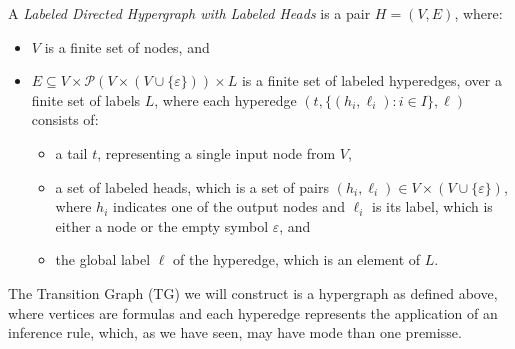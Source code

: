 \begin{definition}
A \emph{Labeled Directed Hypergraph with Labeled Heads} is a pair $H = (V, E)$, where:
\begin{itemize}
  \item \( V \) is a finite set of nodes, and
  \item \( E \subseteq V \times \mathcal{P}(V \times (V \cup \{\varepsilon\})) \times L \) is a finite set of labeled hyperedges, over a finite set of labels $L$, where each hyperedge $(t,\{(h_i,\ell_i): i\in I\}, \ell)$ consists of:
  \begin{itemize}
    \item a tail $t$, representing a single input node from \( V \),
    \item a set of labeled heads, which is a set of pairs \( (h_i, \ell_i) \in V \times (V \cup \{\varepsilon\}) \), where \( h_i \) indicates one of the output nodes and \( \ell_i \) is its label, which is either a node or the empty symbol \( \varepsilon \), and
    \item the global label $\ell$ of the hyperedge, which is an element of \( L \).
  \end{itemize}
\end{itemize}
\end{definition}

The Transition Graph (TG) we will construct is a hypergraph as defined above, where vertices are formulas and each hyperedge represents the application of an inference rule, which, as we have seen, may have mode than one premisse. 




